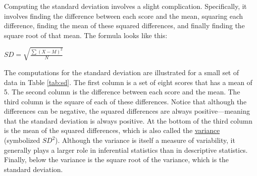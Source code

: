 \documentclass[
]{krantz}
\begin{document}
Computing the standard deviation involves a slight complication. Specifically, it involves finding the difference between each score and the mean, squaring each difference, finding the mean of these squared differences, and finally finding the square root of that mean. The formula looks like this:

\(SD=\sqrt{\frac{\sum(X-M)^2}{N}}\)

The computations for the standard deviation are illustrated for a small set of data in Table \ref{tab:sd}. The first column is a set of eight scores that has a mean of 5. The second column is the difference between each score and the mean. The third column is the square of each of these differences. Notice that although the differences can be negative, the squared differences are always positive---meaning that the standard deviation is always positive. At the bottom of the third column is the mean of the squared differences, which is also called the \protect\hyperlink{variance}{variance} (symbolized \(SD^2\)). Although the variance is itself a measure of variability, it generally plays a larger role in inferential statistics than in descriptive statistics. Finally, below the variance is the square root of the variance, which is the standard deviation.
\end{document}
